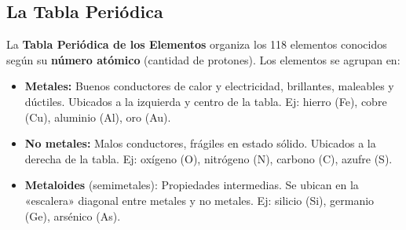 \documentclass[12pt, letterpaper]{article}
\begin{document}
\subsection{La Tabla Periódica}

La \textbf{Tabla Periódica de los Elementos} organiza los 118 elementos conocidos según su \textbf{número atómico} (cantidad de protones). Los elementos se agrupan en:

\begin{cuadrosolucion}
  \begin{itemize}[leftmargin=*]
    \item \textbf{Metales:} Buenos conductores de calor y electricidad, brillantes, maleables y dúctiles. Ubicados a la izquierda y centro de la tabla. Ej: hierro (Fe), cobre (Cu), aluminio (Al), oro (Au).

    \item \textbf{No metales:} Malos conductores, frágiles en estado sólido. Ubicados a la derecha de la tabla. Ej: oxígeno (O), nitrógeno (N), carbono (C), azufre (S).

    \item \textbf{Metaloides} (semimetales): Propiedades intermedias. Se ubican en la «escalera» diagonal entre metales y no metales. Ej: silicio (Si), germanio (Ge), arsénico (As).
  \end{itemize}
\end{cuadrosolucion}
\end{document}
